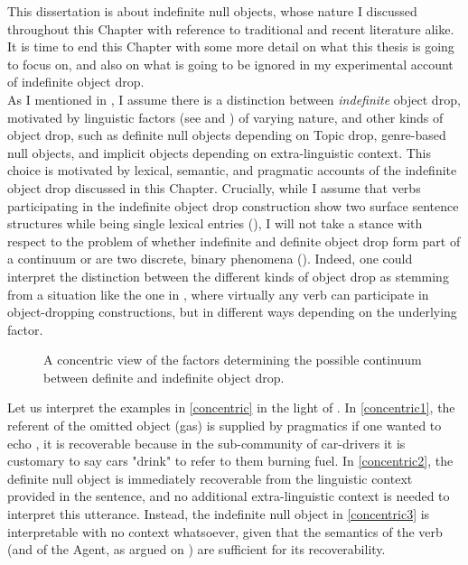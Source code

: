This dissertation is about indefinite null objects, whose nature I discussed throughout this Chapter with reference to traditional and recent literature alike. It is time to end this Chapter with some more detail on what this thesis is going to focus on, and also on what is going to be ignored in my experimental account of indefinite object drop.\\
As I mentioned in , I assume there is a distinction between \textit{indefinite} object drop, motivated by linguistic factors (see  and ) of varying nature, and other kinds of object drop, such as definite null objects depending on Topic drop, genre-based null objects, and implicit objects depending on extra-linguistic context. This choice is motivated by lexical, semantic, and pragmatic accounts of the indefinite object drop discussed in this Chapter. Crucially, while I assume that verbs participating in the indefinite object drop construction show two surface sentence structures while being single lexical entries (), I will not take a stance with respect to the problem of whether indefinite and definite object drop form part of a continuum or are two discrete, binary phenomena (). Indeed, one could interpret the distinction between the different kinds of object drop as stemming from a situation like the one in , where virtually any verb can participate in object-dropping constructions, but in different ways depending on the underlying factor.

\begin{figure}[htb]
\caption{A concentric view of the factors determining the possible continuum between definite and indefinite object drop.}
\end{figure}

Let us interpret the examples in \ref{concentric} in the light of . In \ref{concentric1}, the referent of the omitted object (gas) is supplied by pragmatics \textemdash if one wanted to echo \textcite{Glass2020}, it is recoverable because in the sub-community of car-drivers it is customary to say cars "drink" to refer to them burning fuel. In \ref{concentric2}, the definite null object is immediately recoverable from the linguistic context provided in the sentence, and no additional extra-linguistic context is needed to interpret this utterance. Instead, the indefinite null object in \ref{concentric3} is interpretable with no context whatsoever, given that the semantics of the verb (and of the Agent, as argued on ) are sufficient for its recoverability.

